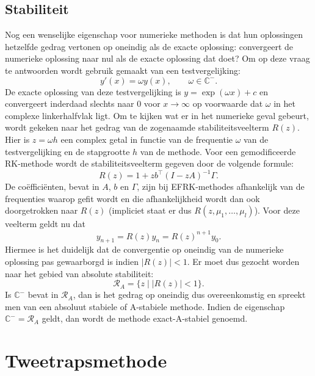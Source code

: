 \documentclass[12pt]{article}
\begin{document}
\subsection{Stabiliteit}
Nog een wenselijke eigenschap voor numerieke methoden is dat hun oplossingen hetzelfde gedrag vertonen op oneindig als de exacte oplossing: convergeert de numerieke oplossing naar nul als de exacte oplossing dat doet? Om op deze vraag te antwoorden wordt gebruik gemaakt van een testvergelijking:
\begin{equation} \label{eq:testeq}
    y'(x)=\omega y(x),\qquad\omega\in\mathbb{C}^-.
\end{equation}
De exacte oplossing van deze testvergelijking is \(y=\exp(\omega x)+c\) en convergeert inderdaad slechts naar 0 voor \(x\to\infty\) op voorwaarde dat \(\omega\) in het complexe linkerhalfvlak ligt. Om te kijken wat er in het numerieke geval gebeurt, wordt gekeken naar het gedrag van de zogenaamde stabiliteitsveelterm \(R(z)\). Hier is \(z=\omega h\) een complex getal in functie van de frequentie \(\omega\) van de testvergelijking en de stapgrootte \(h\) van de methode. Voor een gemodificeerde RK-methode wordt de stabiliteitsveelterm gegeven door de volgende formule:
\begin{equation} \label{eq:stability}
    R(z)=1+zb^\top(I-zA)^{-1}\Gamma.
\end{equation}
De coëfficiënten, bevat in \(A\), \(b\) en \(\Gamma\), zijn bij EFRK-methodes afhankelijk van de frequenties waarop gefit wordt en die afhankelijkheid wordt dan ook doorgetrokken naar \(R(z)\) (impliciet staat er dus \(R(z,\mu_1,\dots,\mu_l)\)). Voor deze veelterm geldt nu dat
\begin{equation*}
    y_{n+1}=R(z)y_n=R(z)^{n+1}y_0.
\end{equation*}
Hiermee is het duidelijk dat de convergentie op oneindig van de numerieke oplossing pas gewaarborgd is indien \(|R(z)|<1\). Er moet dus gezocht worden naar het gebied van absolute stabiliteit:
\begin{equation} \label{eq:absstab}
    \mathcal{R}_A=\{z\;|\;|R(z)|<1\}.
\end{equation}
Is \(\mathbb{C}^-\) bevat in \(\mathcal{R}_A\), dan is het gedrag op oneindig dus overeenkomstig en spreekt men van een absoluut stabiele of A-stabiele methode. Indien de eigenschap \(\mathbb{C}^-=\mathcal{R}_A\) geldt, dan wordt de methode exact-A-stabiel genoemd.

\newpage
\section{Tweetrapsmethode} \label{sec:rks2}
\end{document}
